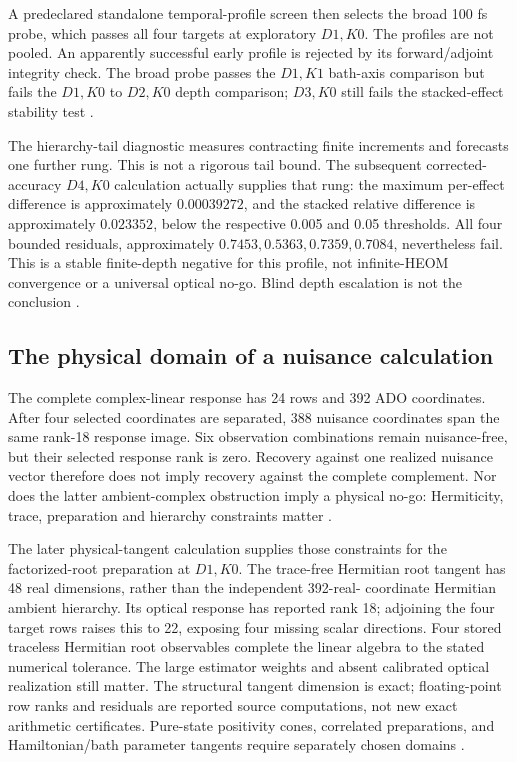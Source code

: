 \documentclass[11pt]{article}
\theoremstyle{definition}
\theoremstyle{remark}
\begin{document}
A predeclared standalone temporal-profile screen then selects the broad
100 fs probe, which passes all four targets at exploratory \(D1,K0\).
The profiles are not pooled. An apparently successful early profile is
rejected by its forward/adjoint integrity check. The broad probe passes
the \(D1,K1\) bath-axis comparison but fails the \(D1,K0\) to \(D2,K0\)
depth comparison; \(D3,K0\) still fails the stacked-effect stability test
\cite{beq21,beq22,beq23}.

The hierarchy-tail diagnostic measures contracting finite increments and
forecasts one further rung. This is not a rigorous tail bound. The subsequent
corrected-accuracy \(D4,K0\) calculation actually supplies that rung:
the maximum per-effect difference is approximately \(0.00039272\), and
the stacked relative difference is approximately \(0.023352\), below
the respective 0.005 and 0.05 thresholds. All four bounded residuals,
approximately \(0.7453,0.5363,0.7359,0.7084\), nevertheless fail. This is a
stable finite-depth negative for this profile, not infinite-HEOM convergence
or a universal optical no-go. Blind depth escalation is not the conclusion
\cite{beq24,beq25}.

\subsection{The physical domain of a nuisance calculation}
\label{sec:physical-tangent}
The complete complex-linear response has 24 rows and 392 ADO coordinates.
After four selected coordinates are separated, 388 nuisance coordinates
span the same rank-18 response image. Six observation combinations remain
nuisance-free, but their selected response rank is zero. Recovery against
one realized nuisance vector therefore does not imply recovery against the
complete complement. Nor does the latter ambient-complex obstruction imply
a physical no-go: Hermiticity, trace, preparation and hierarchy constraints
matter \cite{beq27}.

The later physical-tangent calculation supplies those constraints for the
factorized-root preparation at \(D1,K0\). The trace-free Hermitian root
tangent has 48 real dimensions, rather than the independent 392-real-
coordinate Hermitian ambient hierarchy. Its optical response has reported
rank 18; adjoining the four target rows raises this to 22, exposing four
missing scalar directions. Four stored traceless Hermitian root observables
complete the linear algebra to the stated numerical tolerance. The large
estimator weights and absent calibrated optical realization still matter.
The structural tangent dimension is exact; floating-point row ranks and
residuals are reported source computations, not new exact arithmetic
certificates. Pure-state positivity cones, correlated preparations, and
Hamiltonian/bath parameter tangents require separately chosen domains
\cite{beq26}.
\end{document}

